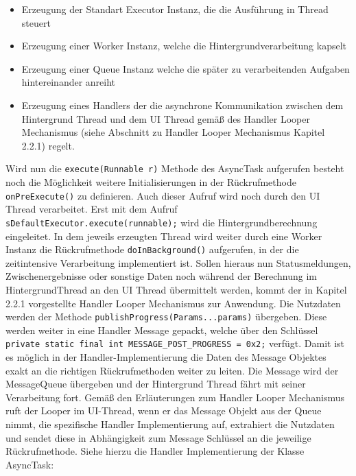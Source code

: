 \documentclass[12pt,oneside,a4paper,bibtotoc,liststotoc]{scrreprt}
\begin{document}
\begin{itemize}
\item Erzeugung der Standart Executor Instanz, die die Ausführung in Thread steuert
\item Erzeugung einer Worker Instanz, welche die Hintergrundverarbeitung kapselt
\item Erzeugung einer Queue Instanz welche die später zu verarbeitenden Aufgaben hintereinander anreiht
\item Erzeugung eines Handlers der die asynchrone Kommunikation zwischen dem Hintergrund Thread und dem UI Thread gemäß des Handler Looper Mechanismus (siehe Abschnitt zu Handler Looper Mechanismus Kapitel 2.2.1) regelt.
\end{itemize}
Wird nun die \texttt{execute(Runnable r)} Methode des AsyncTask aufgerufen besteht noch die Möglichkeit weitere Initialisierungen in der Rückrufmethode \texttt{onPreExecute()} zu definieren. Auch dieser Aufruf wird noch durch den UI Thread verarbeitet. Erst mit dem Aufruf 
\texttt{sDefaultExecutor.execute(runnable);} wird die Hintergrundberechnung eingeleitet. In dem jeweils erzeugten Thread wird weiter durch eine Worker Instanz die Rückrufmethode \texttt{doInBackground()} aufgerufen, in der die zeitintensive Verarbeitung implementiert ist. Sollen hieraus nun Statusmeldungen, Zwischenergebnisse oder sonstige Daten noch während der Berechnung im HintergrundThread an den UI Thread übermittelt werden, kommt der in Kapitel 2.2.1 vorgestellte Handler Looper Mechanismus zur Anwendung. Die Nutzdaten werden der Methode \texttt{publishProgress(Params...params)} übergeben. Diese werden weiter in eine Handler Message gepackt, welche über den Schlüssel \newline
\texttt{private static final int MESSAGE\_POST\_PROGRESS = 0x2;}\newline
verfügt. Damit ist es möglich in der Handler-Implementierung die Daten des Message Objektes exakt an die richtigen Rückrufmethoden weiter zu leiten. Die Message wird der MessageQueue übergeben und der Hintergrund Thread fährt mit seiner Verarbeitung fort. Gemäß den Erläuterungen zum Handler Looper Mechanismus ruft der Looper im UI-Thread, wenn er das Message Objekt aus der Queue nimmt, die spezifische Handler Implementierung auf, extrahiert die Nutzdaten und sendet diese in Abhängigkeit zum Message Schlüssel an die jeweilige Rückrufmethode. Siehe hierzu die Handler Implementierung der Klasse AsyncTask:\newline
\end{document}
